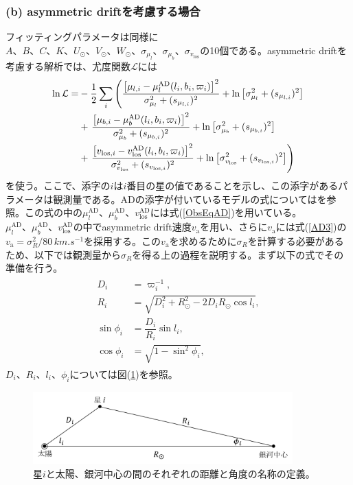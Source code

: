 \subsubsection{(b) asymmetric driftを考慮する場合 \label{asymmetric driftを考慮する場合}}
フィッティングパラメータは同様に$A、B、C、K、U_{\odot}、V_{\odot}、W_{\odot}、\sigma_{\mu_l}、\sigma_{\mu_b}、\sigma_{v_{\mathrm{los}}}$の10個である。asymmetric driftを考慮する解析では、尤度関数$\mathcal{L}$には
\begin{align}
\begin{aligned}
	\ln \mathcal{L} =& -\frac{1}{2}\sum_i \left(\frac{\left[\mu_{l,i} - \mu_l^{\mathrm{AD}}(l_i,b_i,\varpi_i)\right]^2}{\sigma_{\mu_l}^2 + (s_{\mu_{l,i}})^2}  + {\rm ln}\left[\sigma_{\mu_l}^2 + (s_{\mu_{l,i}})^2\right] \right. \\
	&+ \left. \frac{\left[\mu_{b,i} - \mu_b^{\mathrm{AD}}(l_i,b_i,\varpi_i)\right]^2}{\sigma_{\mu_b}^2 + (s_{\mu_{b,i}})^2}  + {\rm ln}\left[\sigma_{\mu_b}^2 + (s_{\mu_{b,i}})^2\right] \right. \\
	&+ \left. \frac{\left[v_{\mathrm{los},i} - v^{\mathrm{AD}}_{\mathrm{los}}(l_i,b_i,\varpi_i)\right]^2}{\sigma_{v_{\mathrm{los}}}^2 + (s_{v_{\mathrm{los},i}})^2} + {\rm ln}\left[\sigma_{v_{\mathrm{los}}}^2 + (s_{v_{\mathrm{los},i}})^2\right] \right)
\end{aligned} \label{Likelihood_Mock_AD}
\end{align}
を使う。ここで、添字の$i$は$i$番目の星の値であることを示し、この添字があるパラメータは観測量である。ADの添字が付いているモデルの式についてはを参照。この式の中の$\mu_l^{\mathrm{AD}}、\mu_b^{\mathrm{AD}}、v^{\mathrm{AD}}_{\mathrm{los}}$には式(\ref{ObsEqAD})を用いている。$\mu_l^{\mathrm{AD}}、\mu_b^{\mathrm{AD}}、v^{\mathrm{AD}}_{\mathrm{los}}$の中でasymmetric drift速度$v_{\mathrm{a}}$を用い、さらに$v_{\mathrm{a}}$には式(\ref{AD3})の$v_{\mathrm{a}}=\sigma^2_R/80\,\si{km.s^{-1}}$を採用する。この$v_{\mathrm{a}}$を求めるために$\sigma_R$を計算する必要があるため、以下では観測量から$\sigma_R$を得る上の過程を説明する。まず以下の式でその準備を行う。
\begin{align}
\begin{aligned}
	D_i &= \varpi_i^{-1},\\
	R_i &= \sqrt{D_i^2 + R_{\odot}^2 - 2D_iR_{\odot}\cos{l_i}},\\
	\sin{\phi_i} &= \dfrac{D_i}{R_i}\sin{l_i},\\
	\cos{\phi_i} &= \sqrt{1 - \sin^2{\phi_i}},
\end{aligned} \label{eq142}
\end{align}
$D_i、R_i、l_i、\phi_i$については図(\ref{coor_a})を参照。
\begin{figure}
	\centering
	\includegraphics[width=10cm]{fig/coordinate_a2.pdf}
	\caption{星$i$と太陽、銀河中心の間のそれぞれの距離と角度の名称の定義。}
	\label{coor_a}
\end{figure}

